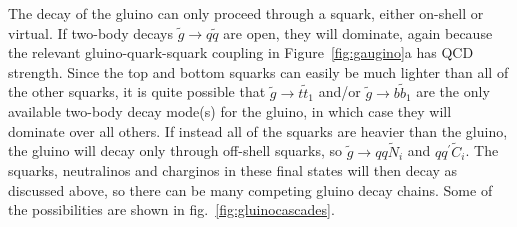 \documentclass[11pt]{article}
\def\stilde{\widetilde}
\begin{document}
The decay of the gluino can only proceed through a squark, either on-shell 
or virtual.  If two-body decays $ \stilde g \rightarrow q\stilde q $ are 
open, they will dominate, again because the relevant gluino-quark-squark 
coupling in Figure~\ref{fig:gaugino}a has QCD strength.  Since the top and 
bottom squarks can easily be much lighter than all of the other squarks, 
it is quite possible that $ \stilde g \rightarrow t \stilde t_1$ and/or 
$\stilde g \rightarrow b \stilde b_1$ are the only available two-body 
decay mode(s) for the gluino, in which case they will dominate over all 
others. If instead all of the squarks are heavier than the gluino, the 
gluino will decay only through off-shell squarks, so $ \stilde g 
\rightarrow q q \stilde N_i$ and $ q q^\prime \stilde C_i $. The squarks, 
neutralinos and charginos in these final states will then decay as 
discussed above, so there can be many competing gluino decay chains. Some 
of the possibilities are shown in fig.~\ref{fig:gluinocascades}.
\end{document}
